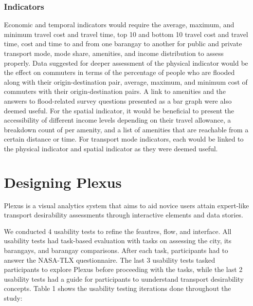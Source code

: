 \documentclass{sigchi}
\begin{document}
\subsubsection{Indicators}
Economic and temporal indicators would require the average, maximum, and minimum travel cost and travel time, top 10 and bottom 10 travel cost and travel time, cost and time to and from one barangay to another for public and private transport mode, mode share, amenities, and income distribution to assess properly. Data suggested for deeper assessment of the physical indicator would be the effect on commuters in terms of the percentage of people who are flooded along with their origin-destination pair, average, maximum, and minimum cost of commuters with their origin-destination pairs. A link to amenities and the answers to flood-related survey questions presented as a bar graph were also deemed useful. For the spatial indicator, it would be beneficial to present the accessibility of different income levels depending on their travel allowance, a breakdown count of per amenity, and a list of amenities that are reachable from a certain distance or time. For transport mode indicators, each would be linked to the physical indicator and spatial indicator as they were deemed useful.

\section{Designing Plexus}
Plexus is a visual analytics system that aims to aid novice users attain expert-like transport desirability assessments through interactive elements and data stories. 


We conducted 4 usability tests to refine the feautres, flow, and interface. All usability tests had task-based evaluation with tasks on assessing the city, its barangays, and barangay comparisons. After each task, participants had to answer the NASA-TLX questionnaire. The last 3 usability tests tasked participants to explore Plexus before proceeding with the tasks, while the last 2 usability tests had a guide for participants to uunderstand transport desirability concepts. Table 1 shows the usability testing iterations done throughout the study:
\end{document}
